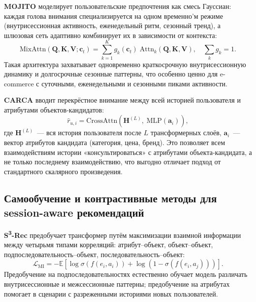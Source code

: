 \textbf{MOJITO} \cite{tran2023mojito} моделирует пользовательские предпочтения как смесь Гауссиан: каждая голова внимания специализируется на одном временно'м режиме (внутрисессионная активность, еженедельный ритм, сезонный тренд), а шлюзовая сеть адаптивно комбинирует их в зависимости от контекста:
\begin{equation}
    \mathrm{MixAttn}(\mathbf{Q},\mathbf{K},\mathbf{V};\mathbf{c}_t)
    = \sum_{k=1}^{K} g_k(\mathbf{c}_t)\;\mathrm{Attn}_k(\mathbf{Q},\mathbf{K},\mathbf{V}),
    \quad \sum_{k} g_k = 1.
\end{equation}
Такая архитектура захватывает одновременно краткосрочную внутрисессионную динамику и долгосрочные сезонные паттерны, что особенно ценно для e-commerce с суточными, еженедельными и сезонными пиками активности.

\textbf{CARCA} \cite{rashed2022carca} вводит перекрёстное внимание между всей историей пользователя и атрибутами объектов-кандидатов:
\begin{equation}
    \hat{r}_{u,i} = \mathrm{CrossAttn}\!\left(\mathbf{H}^{(L)},\; \mathrm{MLP}(\mathbf{a}_i)\right),
\end{equation}
где $\mathbf{H}^{(L)}$~--- вся история пользователя после $L$ трансформерных слоёв, $\mathbf{a}_i$~--- вектор атрибутов кандидата (категория, цена, бренд). 
Это позволяет всем взаимодействиям истории «консультироваться» с атрибутами объекта-кандидата, а не только последнему взаимодействию, что выгодно отличает подход от стандартного скалярного произведения.

\subsection{Самообучение и контрастивные методы для session-aware рекомендаций}
\label{subsec:ch1:ssl_session}

\textbf{S\textsuperscript{3}-Rec} \cite{zhou2020s3rec} предобучает трансформер путём максимизации взаимной информации между четырьмя типами корреляций: атрибут--объект, объект--объект, подпоследовательность--объект, последовательность--объект:
\begin{equation}
    \mathcal{L}_\text{MI}
    = -\mathbb{E}\!\left[
        \log \sigma\!\left(f(e_i, a_i)\right)
        + \log\!\left(1 - \sigma\!\left(f(e_i, a_j)\right)\right)
    \right].
\end{equation}
Предобучение на подпоследовательностях естественно обучает модель различать внутрисессионные и межсессионные паттерны; 
предобучение на атрибутах помогает в сценарии с разреженными историями новых пользователей.

